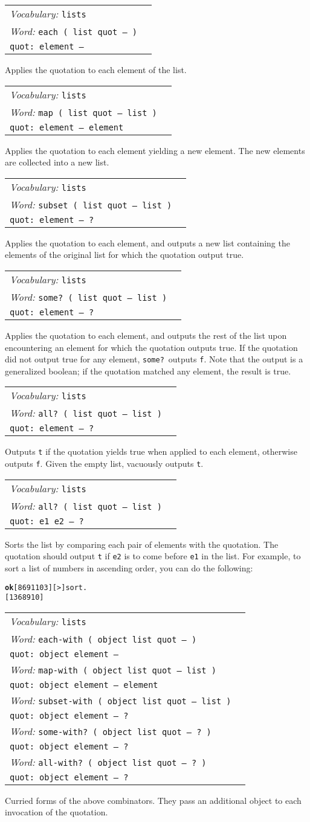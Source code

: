 \documentclass{book}
\newcommand{\vocabulary}[1]{\emph{Vocabulary:} \texttt{#1}&\\}
\newcommand{\ordinaryword}[2]{\index{\texttt{#1}}\emph{Word:} \texttt{#2}&\\}
\newcommand{\wordtable}[1]{

\begin{tabularx}{12cm}[t]{lX}
\hline
#1
\hline
\end{tabularx}

}
\begin{document}
\wordtable{
\vocabulary{lists}
\ordinaryword{each}{each ( list quot -- )}
\texttt{quot:~element --}\\
}
Applies the quotation to each element of the list.
\wordtable{
\vocabulary{lists}
\ordinaryword{map}{map ( list quot -- list )}
\texttt{quot:~element -- element}\\
}
Applies the quotation to each element yielding a new element. The new elements are collected into a new list.
\wordtable{
\vocabulary{lists}
\ordinaryword{subset}{subset ( list quot -- list )}
\texttt{quot:~element -- ?}\\
}
Applies the quotation to each element, and outputs a new list containing the elements of the original list for which the quotation output true.
\wordtable{
\vocabulary{lists}
\ordinaryword{some?}{some?~( list quot -- list )}
\texttt{quot:~element -- ?}\\
}
Applies the quotation to each element, and outputs the rest of the list upon encountering an element for which the quotation outputs true. If the quotation did not output true for any element, \texttt{some?}~outputs \texttt{f}. Note that the output is a generalized boolean; if the quotation matched any element, the result is true.
\wordtable{
\vocabulary{lists}
\ordinaryword{all?}{all?~( list quot -- list )}
\texttt{quot:~element -- ?}\\
}
Outputs \texttt{t} if the quotation yields true when applied to each element, otherwise outputs \texttt{f}. Given the empty list, vacuously outputs \texttt{t}.
\wordtable{
\vocabulary{lists}
\ordinaryword{sort}{all?~( list quot -- list )}
\texttt{quot:~e1 e2 -- ?}\\
}
Sorts the list by comparing each pair of elements with the quotation. The quotation should output \texttt{t} if \texttt{e2} is to come before \texttt{e1} in the list. For example, to sort a list of numbers in ascending order, you can do the following:
\begin{alltt}
\textbf{ok} [ 8 6 9 1 10 3 ] [ > ] sort .
[ 1 3 6 8 9 10 ]
\end{alltt}
\wordtable{
\vocabulary{lists}
\ordinaryword{each-with}{each-with ( object list quot -- )}
\texttt{quot:~object element --}\\
\ordinaryword{map-with}{map-with ( object list quot -- list )}
\texttt{quot:~object element -- element}\\
\ordinaryword{subset-with}{subset-with ( object list quot -- list )}
\texttt{quot:~object element -- ?}\\
\ordinaryword{some-with?}{some-with?~( object list quot -- ?~)}
\texttt{quot:~object element -- ?}\\
\ordinaryword{all-with?}{all-with?~( object list quot -- ?~)}
\texttt{quot:~object element -- ?}\\
}
Curried forms of the above combinators. They pass an additional object to each invocation of the quotation.
\end{document}
